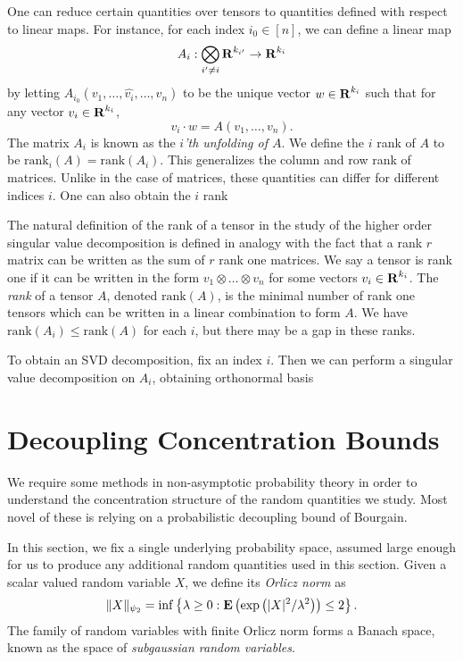 One can reduce certain quantities over tensors to quantities defined with respect to linear maps. For instance, for each index $i_0 \in [n]$, we can define a linear map
%
\[ A_i: \bigotimes_{i' \neq i} \operatorname{\mathbf{R}}^{k_{i'}} \to \operatorname{\mathbf{R}}^{k_i} \]
%
by letting $A_{i_0}(v_1, \dots, \widehat{v_i}, \dots, v_n)$ to be the unique vector $w \in \operatorname{\mathbf{R}}^{k_i}$ such that for any vector $v_i \in \operatorname{\mathbf{R}}^{k_i}$,
%
\[ v_i \cdot w = A(v_1, \dots, v_n). \]
%
The matrix $A_i$ is known as the \emph{$i$'th unfolding of $A$}. We define the $i$ rank of $A$ to be $\text{rank}_i(A) = \text{rank}(A_i)$. This generalizes the column and row rank of matrices. Unlike in the case of matrices, these quantities can differ for different indices $i$. One can also obtain the $i$ rank

The natural definition of the rank of a tensor in the study of the higher order singular value decomposition is defined in analogy with the fact that a rank $r$ matrix can be written as the sum of $r$ rank one matrices. We say a tensor is rank one if it can be written in the form $v_1 \otimes \dots \otimes v_n$ for some vectors $v_i \in \operatorname{\mathbf{R}}^{k_i}$. The \emph{rank} of a tensor $A$, denoted $\text{rank}(A)$, is the minimal number of rank one tensors which can be written in a linear combination to form $A$. We have $\text{rank}(A_i) \leq \text{rank}(A)$ for each $i$, but there may be a gap in these ranks.

To obtain an SVD decomposition, fix an index $i$. Then we can perform a singular value decomposition on $A_i$, obtaining orthonormal basis

\section{Decoupling Concentration Bounds}

We require some methods in non-asymptotic probability theory in order to understand the concentration structure of the random quantities we study. Most novel of these is relying on a probabilistic decoupling bound of Bourgain.

In this section, we fix a single underlying probability space, assumed large enough for us to produce any additional random quantities used in this section. Given a scalar valued random variable $X$, we define its \emph{Orlicz norm} as
%
\[ \| X \|_{\psi_2} = \inf \left\{ \lambda \geq 0 : \operatorname{\mathbf{E}} \left(\exp \left( |X|^2/\lambda^2 \right) \right) \leq 2 \right\}. \]
%
The family of random variables with finite Orlicz norm forms a Banach space, known as the space of \emph{subgaussian random variables}.

